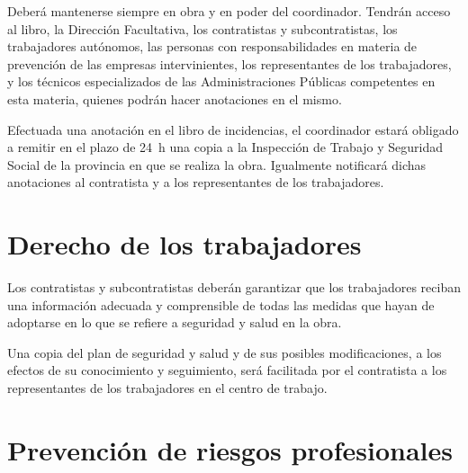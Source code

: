 Deberá mantenerse siempre en obra y en poder del coordinador. Tendrán acceso al libro, la Dirección Facultativa, los contratistas y subcontratistas, los trabajadores autónomos, las personas con responsabilidades en materia de prevención de las empresas intervinientes, los representantes de los trabajadores, y los técnicos especializados de las Administraciones Públicas competentes en esta materia, quienes podrán hacer anotaciones en el mismo.

Efectuada una anotación en el libro de incidencias, el coordinador estará obligado a remitir en el plazo de \SI{24}{\hour} una copia a la Inspección de Trabajo y Seguridad Social de la provincia en que se realiza la obra. Igualmente notificará dichas anotaciones al contratista y a los representantes de los trabajadores.
\section{Derecho de los trabajadores}
\label{sec:sys-derechos}
Los contratistas y subcontratistas deberán garantizar que los trabajadores reciban una información adecuada y comprensible de todas las medidas que hayan de adoptarse en lo que se refiere a seguridad y salud en la obra.

Una copia del plan de seguridad y salud y de sus posibles modificaciones, a los efectos de su conocimiento y seguimiento, será facilitada por el contratista a los representantes de los trabajadores en el centro de trabajo.
\section{Prevención de riesgos profesionales}
\label{sec:sys-prl}
